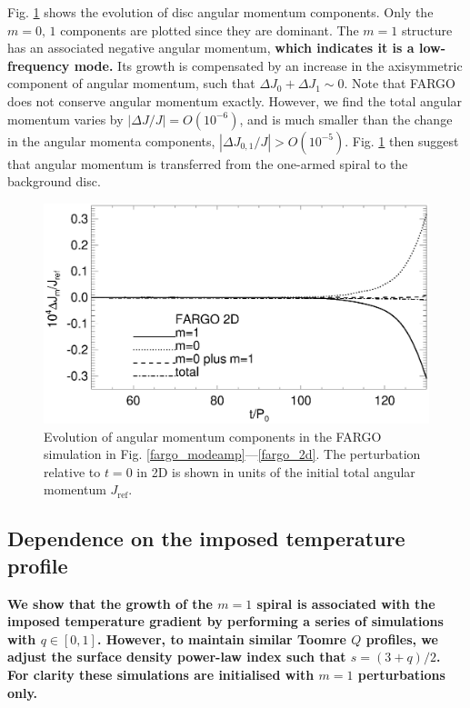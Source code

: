 Fig. \ref{2d_angmom} shows the evolution of disc angular momentum
components. Only the $m=0,\,1$ components are 
plotted since they are dominant. The $m=1$ structure has
an associated negative angular momentum, {\bf which indicates it is a
  low-frequency mode.}   
Its growth is compensated by an increase in the axisymmetric
component of angular momentum, such that $\Delta J_0 + \Delta
J_1 \sim 0$. Note that FARGO does not conserve angular momentum
exactly. However, we find the total angular momentum varies by 
$|\Delta J/J|= O(10^{-6})$, and is much smaller than the
change in the angular momenta components, $|\Delta J_{0,1}/J|>
O(10^{-5})$. Fig. \ref{2d_angmom} then suggest that angular momentum
is transferred from the one-armed spiral to the background disc.    

\begin{figure}
  \includegraphics[width=\linewidth]{figures/nonaxi_evol_ang_fargo}
  \caption{Evolution of angular momentum components in the 
    FARGO simulation in Fig. \ref{fargo_modeamp}---\ref{fargo_2d}. The
    perturbation relative to $t=0$ in 2D is shown in units of the 
    initial total angular momentum $J_\mathrm{ref}$.\label{2d_angmom}} 
\end{figure}   


\subsection{Dependence on the imposed temperature profile}
{\bf We show that the growth of the $m=1$ spiral is
  associated with the imposed temperature gradient  by performing a 
  series of simulations with $q\in[0,1]$.  However, to maintain similar Toomre $Q$
  profiles, we adjust the surface density power-law index such
  that $s = (3+q)/2$.  For clarity these simulations are initialised
  with $m=1$ perturbations only.  
}


